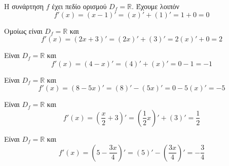 \begin{alist}
\item Η συνάρτηση $ f $ έχει πεδίο ορισμού $ D_f=\mathbb{R} $. Έχουμε λοιπόν
\[ f'(x)=(x-1)'=(x)'+(1)'=1+0=0 \]
\item Ομοίως είναι $ D_f=\mathbb{R} $ και
\[ f'(x)=(2x+3)'=(2x)'+(3)'=2(x)'+0=2 \]
\item Είναι $ D_f=\mathbb{R} $ και
\[ f'(x)=(4-x)'=(4)'+(x)'=0-1=-1 \]
\item Είναι $ D_f=\mathbb{R} $ και
\[ f'(x)=(8-5x)'=(8)'-(5x)'=0-5(x)'=-5 \]
\item Είναι $ D_f=\mathbb{R} $ και
\[ f'(x)=\left(\frac{x}{2}+3\right)'=\left(\frac{1}{2}x\right)'+(3)'=\frac{1}{2} \]
\item Είναι $ D_f=\mathbb{R} $ και
\[ f'(x)=\left(5-\frac{3x}{4}\right)'=(5)'-\left(\frac{3x}{4}\right)'=-\frac{3}{4} \]
\end{alist}
